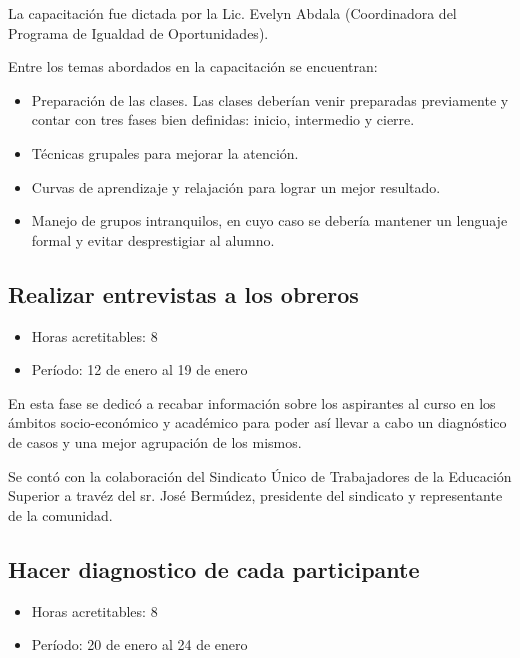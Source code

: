              La capacitación fue dictada por la Lic. Evelyn Abdala (Coordinadora del Programa de Igualdad de
             Oportunidades).
             
             Entre los temas abordados en la capacitación se encuentran:
             
             \begin{itemize}
                 \item Preparación de las clases. Las clases deberían venir preparadas previamente y contar con tres fases bien definidas: inicio, intermedio y cierre.
                 
                 \item Técnicas grupales para mejorar la atención.
                 
                 \item Curvas de aprendizaje y relajación para lograr un mejor resultado.
                 
                 \item Manejo de grupos intranquilos, en cuyo caso se debería mantener un lenguaje formal y evitar desprestigiar al alumno.
                 
                \end{itemize}
             
             \subsection {Realizar entrevistas a los obreros}
             \begin{itemize}
                 \item Horas acretitables: 8
                 \item Período: 12 de enero al 19 de enero
                \end{itemize}
             
             En esta fase se dedicó a recabar información sobre los aspirantes al curso en los ámbitos socio-económico y académico para poder así llevar a cabo un diagnóstico de casos y una mejor agrupación de los mismos.
             
             Se contó con la colaboración del Sindicato Único de Trabajadores de la Educación Superior a travéz del sr. José Bermúdez, presidente del sindicato y representante de la comunidad.
             
             \subsection {Hacer diagnostico de cada participante}
             \begin{itemize}
                 \item Horas acretitables: 8
                 \item Período: 20 de enero al 24 de enero
                \end{itemize}
                

